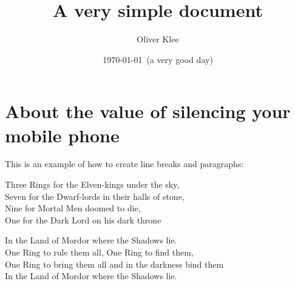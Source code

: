 \documentclass[a4paper]{article}
\title{A very simple document}
\author{Oliver Klee}
\date{\today\ (a very good day)}
\begin{document}
\maketitle

\section{About the value of silencing your mobile phone}

This is an example of how to create line breaks and paragraphs:

Three Rings for the Elven-kings under the sky,\\
Seven for the Dwarf-lords in their halls of stone,\\
Nine for Mortal Men doomed to die,\\
One for the Dark Lord on his dark throne

In the Land of Mordor where the Shadows lie.\\
One Ring to rule them all, One Ring to find them,\\
One Ring to bring them all and in the darkness bind them\\
In the Land of Mordor where the Shadows lie.
\end{document}
